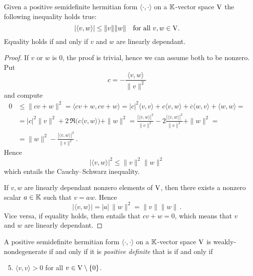 \begin{proposition}
\label{thm:cauchy-schwartz-inequality-inner-product-spaces}
%
Given a positive semidefinite hermitian form $\langle \cdot , \cdot \rangle$ on a $\mathbb{K}$-vector space 
$\mathrm{V}$ the following inequality holds true:
\begin{equation}
\label{eq:cauchy-schwarz-inequality}
  |\langle v, w \rangle| \leq \|v\|\|w\| \quad \text{for all $v,w \in \mathrm{V}$}.
\end{equation}
Equality holds if and only if $v$ and $w$ are linearly dependant.
\end{proposition}
\begin{proof}
If $v$ or $w$ is $0$, the proof is trivial, hence we can assume both to be nonzero. Put
\[
  c = - \frac{\langle v, w \rangle}{\|v\|^2}
\]
and compute
\begin{equation}
\label{eq:expanding-norm-of-sum-in-inner-product-space}
\begin{split}
   0 & \leq \|c v + w\|^2 = \langle c v + w, c v + w \rangle = 
   |c|^2 \langle v, v \rangle + c \langle v, w \rangle + 
   \overline{c}\langle w, v \rangle + \langle w, w \rangle = \\
   & =  |c|^2\|v\|^2 + 2 \, \Re \big( c\langle v, w \rangle \big) + \|w\|^2 = 
   \frac{|\langle v, w \rangle|^2}{\|v\|^2} - 2\frac{|\langle v, w \rangle|^2}{\|v\|^2} + \|w\|^2 = \\
   & = \|w\|^2 - \frac{|\langle v, w \rangle|^2}{\|v\|^2} \ .
 \end{split}
\end{equation}
Hence
\[
   |\langle v, w \rangle|^2 \leq \|v\|^2\|w\|^2 
\]
which entails the Cauchy--Schwarz inequality. 

If $v,w$ are linearly dependant nonzero elements of $\mathrm{V}$, then there exists a nonzero scalar 
$a\in \mathbb{K}$ such that $v = a w$. Hence 
\[
  |\langle v , w \rangle| = |a| \, \| w \|^2 
  = \| v \|  \| w \| \, .
\]
Vice versa, if equality holds, then  
entails that $c v +w  = 0$, which means that $v$ and $w$ are linearly dependant. 
\end{proof}

\begin{lemma}
\label{thm:positive-definitess-equivalent-nondegeneracy}
  A positive semidefinite hermitian form $\langle \cdot , \cdot \rangle$ on a $\mathbb{K}$-vector space 
  $\mathrm{V}$ is weakly-nondegenerate if and only if it is \emph{positive definite} that is if and only if
  \begin{enumerate}[label=\textup{({\sffamily SF\arabic*p)}},leftmargin=*]
  \setcounter{enumi}{4}
  \item
  \label{axiom:form-positive-definite} 
  $\langle v,v \rangle > 0$ for all $v\in \mathrm{V} \setminus \{ 0 \}$.
  \end{enumerate}
\end{lemma}

